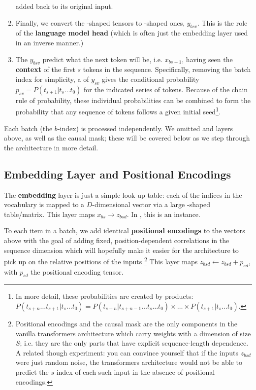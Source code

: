 \begin{enumerate}
              added back to its original input.
	\item Finally, we convert the -shaped
	      tensors to -shaped ones, $ y _{ bsv } $. This is the role of
	      the \textbf{language model head} (which is often just the embedding layer used in an inverse
	      manner.)
	\item  The $ y _{ bsv } $ predict what the next token will be, i.e. $ x _{ bs+1 } $, having seen the \textbf{context}
          of the first $ s $ tokens in the sequence. Specifically, removing the batch index for
          simplicity, a   of $ y _{ sv } $ gives the conditional probability $ p _{ sv
          } = P(t _{ s+1 }|t _{ s } \ldots t _ {0}) $ for the indicated series of tokens. Because of
          the chain rule of probability, these individual probabilities can be combined to form the
          probability that any sequence of tokens follows a given initial seed\footnote{In more
          detail, these probabilities are created by products: $ P(t _{ s+n } \ldots t _{ s+1}| t _{
          s } \ldots  t _{ 0 }) =P(t _{ s+n }| t _{ s+n - 1} \ldots  t _{ s } \ldots  t _{ 0}) \times
      \ldots  \times P(t _{ s+1 } | t _{ s } \ldots  t _{ 0 }) $.}.
\end{enumerate}


Each batch (the $ b $-index) is processed independently. We omitted  and
 layers above, as well as the causal mask; these will be covered below as we step
through the architecture in more detail.



\subsection{Embedding Layer and Positional Encodings \label{subsubsec_embedding_and_pe} }

The \textbf{embedding} layer is just a simple look up table: each of the  indices
in the vocabulary is mapped to a $ D $-dimensional vector via a large -shaped
table/matrix. This layer maps $ x _{ bs } \longrightarrow z _{ bsd } $. In , this is
an  instance.

To each item in a batch, we add identical \textbf{positional encodings} to the vectors above with
the goal of adding fixed, position-dependent correlations in the sequence dimension which will
hopefully make it easier for the architecture to pick up on the relative positions of the inputs
\footnote{Positional encodings and the causal mask are the only components in the vanilla transformers
	architecture which carry weights with a dimension of size $ S $; i.e. they are the only parts that
	have explicit sequence-length dependence. A related though experiment: you can convince yourself
	that if the inputs $ z_{ bsd } $
	were just random noise, the transformers architecture would not be able to predict
	the $ s $-index of each such input in the absence of positional encodings. } This layer maps $ z _{
			bsd} \leftarrow z _{ bsd } + p _{ sd } $, with $ p _{ sd } $ the positional encoding tensor.

